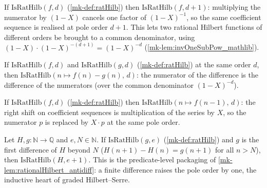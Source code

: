 \begin{lemma}\label{mk-lem:ratHilb_bump}
  \leanok

  If \(\mathrm{IsRatHilb}(f, d)\) (\ref{mk-def:ratHilb}) then
  \(\mathrm{IsRatHilb}(f, d+1)\): multiplying the numerator by \((1-X)\) cancels
  one factor of \((1-X)^{-1}\), so the same coefficient sequence is realised at
  pole order \(d+1\). This lets two rational Hilbert functions of different
  orders be brought to a common denominator, using
  \((1-X)\cdot(1-X)^{-(d+1)} = (1-X)^{-d}\) (\ref{mk-lem:invOneSubPow_mathlib}).
\end{lemma}

\begin{lemma}\label{mk-lem:ratHilb_sub}
  \leanok

  If \(\mathrm{IsRatHilb}(f, d)\) and \(\mathrm{IsRatHilb}(g, d)\)
  (\ref{mk-def:ratHilb}) at the same order \(d\), then
  \(\mathrm{IsRatHilb}(n \mapsto f(n) - g(n),\, d)\): the numerator of the
  difference is the difference of the numerators (over the common denominator
  \((1-X)^{-d}\)).
\end{lemma}

\begin{lemma}\label{mk-lem:ratHilb_shiftRight}
  \leanok

  If \(\mathrm{IsRatHilb}(f, d)\) (\ref{mk-def:ratHilb}) then
  \(\mathrm{IsRatHilb}(n \mapsto f(n-1),\, d)\): the right shift on coefficient
  sequences is multiplication of the series by \(X\), so the numerator
  \(p\) is replaced by \(X\cdot p\) at the same pole order.
\end{lemma}

\begin{lemma}\label{mk-lem:ratHilb_antidiff}
  \leanok

  Let \(H, g : \mathbb{N} \to \mathbb{Q}\) and \(e, N \in \mathbb{N}\). If
  \(\mathrm{IsRatHilb}(g, e)\) (\ref{mk-def:ratHilb}) and \(g\) is the first
  difference of \(H\) beyond \(N\) (\(H(n+1) - H(n) = g(n+1)\) for all
  \(n > N\)), then \(\mathrm{IsRatHilb}(H, e+1)\). This is the predicate-level
  packaging of \ref{mk-lem:rationalHilbert_antidiff}: a finite difference raises
  the pole order by one, the inductive heart of graded Hilbert--Serre.
\end{lemma}

